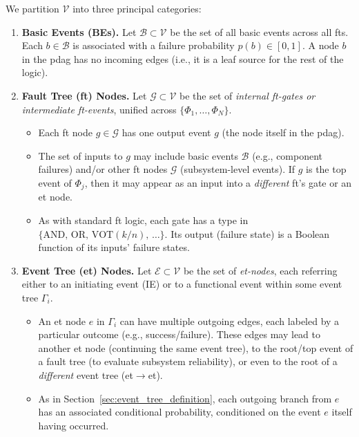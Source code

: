 We partition \(\mathcal{V}\) into three principal categories:
\begin{enumerate}
\item \textbf{Basic Events (BEs).}  Let \(\mathcal{B}\subset \mathcal{V}\) be the set of all basic events across all \acrshort{ft}s.  Each \(b\in\mathcal{B}\) is associated with a failure probability \(p(b)\in [0,1]\).  A node \(b\) in the \acrshort{pdag} has no incoming edges (i.e., it is a leaf source for the rest of the logic).  

\item \textbf{Fault Tree (\acrshort{ft}) Nodes.}  Let \(\mathcal{G}\subset \mathcal{V}\) be the set of \emph{internal \acrshort{ft}-gates or intermediate \acrshort{ft}-events}, unified across \(\{\Phi_1,\dots,\Phi_N\}\).  
    \begin{itemize}
    \item Each \acrshort{ft} node \(g\in \mathcal{G}\) has one output event \(g\) (the node itself in the \acrshort{pdag}).  
    \item The set of inputs to \(g\) may include basic events \(\mathcal{B}\) (e.g., component failures) and/or other \acrshort{ft} nodes \(\mathcal{G}\) (subsystem-level events). If \(g\) is the top event of \(\Phi_j\), then it may appear as an input into a \emph{different} \acrshort{ft}’s gate or an \acrshort{et} node.  
    \item As with standard \acrshort{ft} logic, each gate has a type in \(\{\mathrm{AND},\,\mathrm{OR},\,\mathrm{VOT}(k/n),\,\ldots\}\).  Its output (failure state) is a Boolean function of its inputs’ failure states.
    \end{itemize}

\item \textbf{Event Tree (\acrshort{et}) Nodes.}  Let \(\mathcal{E}\subset \mathcal{V}\) be the set of \emph{\acrshort{et}-nodes}, each referring either to an initiating event (IE) or to a functional event within some event tree \(\Gamma_i\).  
    \begin{itemize}
    \item An \acrshort{et} node \(e\) in \(\Gamma_i\) can have multiple outgoing edges, each labeled by a particular outcome (e.g., success/failure).  These edges may lead to another \acrshort{et} node (continuing the same event tree), to the root/top event of a fault tree (to evaluate subsystem reliability), or even to the root of a \emph{different} event tree (\acrshort{et}\(\to\)\acrshort{et}).
    \item As in Section~\ref{sec:event_tree_definition}, each outgoing branch from \(e\) has an associated conditional probability, conditioned on the event \(e\) itself having occurred.  
    \end{itemize}
\end{enumerate}
